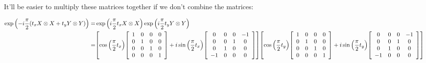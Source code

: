 \documentclass{article}
\begin{document}
It'll be easier to multiply these matrices together if we don't combine the matrices:

\begin{align*}
  \exp\pqty{-i\frac{\pi}{2}\pqty{t_x X\otimes X + t_y Y\otimes Y}} =& \exp\pqty{i\frac{\pi}{2}t_x X\otimes X} \exp\pqty{i\frac{\pi}{2}t_y Y\otimes Y} \\
  =&
  \bqty{
  \cos\pqty{\frac{\pi}{2}t_x}
  \bqty{
  \begin{array}{cccc}
    1&0&0&0 \\
    0&1&0&0 \\
    0&0&1&0 \\
    0&0&0&1 \\
  \end{array}
  }
  +
  i\sin\pqty{\frac{\pi}{2}t_x}
  \bqty{
  \begin{array}{cccc}
    0&0&0&-1 \\
    0&0&1&0 \\
    0&1&0&0 \\
    -1&0&0&0 \\
  \end{array}
  }
  }
  \bqty{
  \cos\pqty{\frac{\pi}{2}t_y}
  \bqty{
  \begin{array}{cccc}
    1&0&0&0 \\
    0&1&0&0 \\
    0&0&1&0 \\
    0&0&0&1 \\
  \end{array}
  }
  +
  i\sin\pqty{\frac{\pi}{2}t_y}
  \bqty{
  \begin{array}{cccc}
    0&0&0&-1 \\
    0&0&1&0 \\
    0&1&0&0 \\
    -1&0&0&0 \\
  \end{array}
  }
  }
\end{align*}
\end{document}
